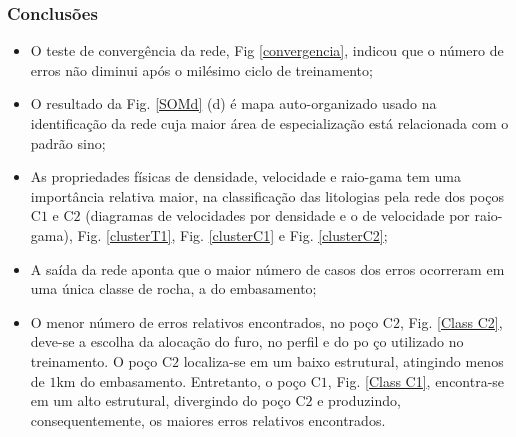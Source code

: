\documentclass[10pt]{beamer} %
\begin{document}
\begin{frame}
	\frametitle{Conclusões}
\begin{small}
	

	\begin{itemize}
		\item O teste de convergência da rede, Fig \ref{convergencia}, indicou que o número de erros não diminui após o milésimo ciclo de treinamento;
		\pause
		\item O resultado da Fig. \ref{SOMd} (d)  é mapa auto-organizado usado na identificação da rede cuja maior área de especialização está relacionada com o padrão sino;
		\pause
		\item As propriedades físicas de densidade, velocidade e raio-gama tem uma importância relativa maior, na classificação das litologias pela rede dos poços  C$1$ e C$2$ (diagramas de velocidades por densidade e o de velocidade por raio-gama), Fig. \ref{clusterT1}, Fig. \ref{clusterC1} e Fig. \ref{clusterC2};
		\pause
		\item A saída da rede aponta que o maior número de casos dos erros ocorreram em uma única classe de rocha, a do embasamento;
		\pause
		\item O menor número de erros relativos encontrados, no poço C$2$, Fig. \ref{Class C2}, deve-se a escolha da alocação do furo, no perfil e do po ço utilizado no treinamento. O poço C$2$ localiza-se em um baixo estrutural, atingindo menos de $1$km do embasamento. Entretanto, o poço C$1$, Fig. \ref{Class C1}, encontra-se em um alto estrutural, divergindo do poço C$2$ e produzindo, consequentemente, os maiores erros relativos encontrados. 
	\end{itemize}
\end{small}	
\end{frame}




\end{document}
